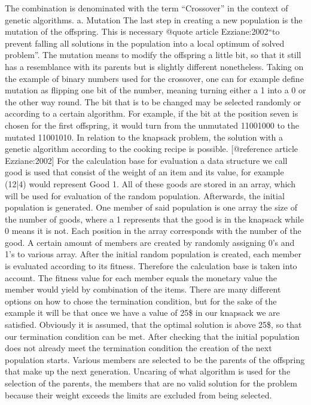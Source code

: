 \documentclass[11pt,a4paper]{article}
\begin{document}
The combination is denominated with the term “Crossover” in the context of genetic algorithms.
a.       Mutation
The last step in creating a new population is the mutation of the offspring. This is necessary @quote article Ezziane:2002“to prevent falling all solutions in the population into a local optimum of solved problem”. The mutation means to modify the offspring a little bit, so that it still has a resemblance with its parents but is slightly different nonetheless.
Taking on the example of binary numbers used for the crossover, one can for example define mutation as flipping one bit of the number, meaning turning either a 1 into a 0 or the other way round. The bit that is to be changed may be selected randomly or according to a certain algorithm.
For example, if the bit at the position seven is chosen for the first offspring, it would turn from the unmutated 11001000 to the mutated 11001010.
In relation to the knapsack problem, the solution with a genetic algorithm according to the cooking recipe is possible. [@reference article Ezziane:2002]
For the calculation base for evaluation a data structure we call good is used that consist of the weight of an item and its value, for example (12|4) would represent Good 1. All of these goods are stored in an array, which will be used for evaluation of the random population.
Afterwards, the initial population is generated. One member of said population is one array the size of the number of goods, where a 1 represents that the good is in the knapsack while 0 means it is not. Each position in the array corresponds with the number of the good. A certain amount of members are created by randomly assigning 0’s and 1’s to various array. After the initial random population is created, each member is evaluated according to its fitness. Therefore the calculation base is taken into account. The fitness value for each member equals the monetary value the member would yield by combination of the items.
There are many different options on how to chose the termination condition, but for the sake of the example it will be that once we have a value of 25\$ in our knapsack we are satisfied. Obviously it is assumed, that the optimal solution is above 25\$, so that our termination condition can be met.
After checking that the initial population does not already meet the termination condition the creation of the next population starts. Various members are selected to be the parents of the offspring that make up the next generation. Uncaring of what algorithm is used for the selection of the parents, the members that are no valid solution for the problem because their weight exceeds the limits are excluded from being selected.
\end{document}
